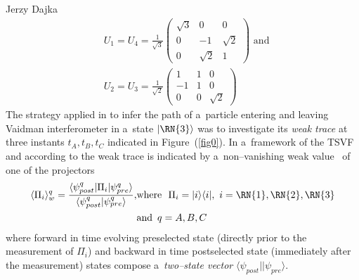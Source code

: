 \begin{artengenv}{Jerzy Dajka}
\begin{equation}\label{bs}
\begin{split}
&U_1 = U_4 =\frac{1}{\sqrt{3}}\left( \begin{array}{ccc} \sqrt{3} & 0 & 0 \\ 0 & -1 & \sqrt{2} \\ 0 & \sqrt{2} & 1  
\end{array}\right)\,\,  \mbox{and}\\%
&U_2 = U_3 =\frac{1}{\sqrt{2}}\left( \begin{array}{ccc} 1 & 1 & 0 \\ -1 & 1 & 0 \\ 0 & 0 & \sqrt{2}  
\end{array}\right)
\end{split}
\end{equation}
The strategy applied in \parencite{PhysRevA.87.052104} to infer the path of a~particle entering  and leaving Vaidman interferometer  in a~state $|\RN{3}\rangle$  was to investigate its {\it weak trace}  at three instants $t_A,t_B,t_C$ indicated in Figure~(\ref{fig0}). In a~framework of the TSVF~\parencite{Aharonov2008} and according to \parencite{PhysRevA.87.052104} the weak trace is indicated by  a~non--vanishing weak value~\parencite{primus,PhysRevA.95.032110} of one of the  projectors
%
\begin{equation}\label{weak0}
\begin{split}
\langle\Pi_i\rangle_w^q=\frac{\langle\psi_{post}^q|\Pi_i|\psi_{pre}^q\rangle}{\langle \psi_{post}^q|\psi_{pre}^q\rangle},%
&\mbox{where}\,\,\,\,\Pi_i =  |i\rangle\langle i|,\,\, i=\RN{1},\RN{2},\RN{3} \\%
&\mbox{and} \,\,\, q=A,B,C 
\end{split} 
\end{equation}
where forward in time evolving preselected state (directly prior to the measurement of $\Pi_i$) and backward in time postselected state (immediately after the measurement) states compose  a~{\it two--state vector} $\langle\psi_{post}||\psi_{pre}\rangle$. 


\end{artengenv}
